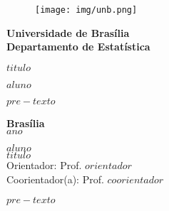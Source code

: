 \documentclass[12pt, a4paper, twoside]{article}
\numberwithin{equation}{subsection} %
\newcommand{\titulo}{$titulo$}
\newcommand{\autor}{$aluno$}
\newcommand{\orientador}{ Prof. $orientador$ }
\newcommand{\coorientador}{ Prof. $coorientador$ }
\begin{document}
\begin{titlepage}
\begin{center}
\begin{figure}[h!]
	\centering
		\texttt{[image: img/unb.png]}
	\label{fig:unb}
\end{figure}
{\bf Universidade de Brasília \\
\bf Departamento de Estatística}
\vspace{5cm}

\setcounter{page}{0}
\null
\textbf{\titulo}
\vspace{2.5cm}


\vspace{0.2cm}
\textbf{\autor}
\end{center}
\vspace{1.5cm}

\begin{flushright}
\begin{minipage}{7.5cm}
\parbox[t]{7.5cm}{$pre-texto$}
\end{minipage}
\end{flushright}

\vspace{5cm}

\begin{center}
{\bf{Brasília} \\ }
\bf{$ano$}
\end{center}
\end{titlepage}



\thispagestyle{empty}

\begin{center}
\textbf{\autor} \\
\vspace{5cm}
\textbf{\titulo} \\
\vspace{3cm}
\small
Orientador: \orientador \\
Coorientador(a): \coorientador
\end{center}


\vspace*{3cm}

\begin{flushright}
\begin{minipage}{7.5cm}
 \parbox[t]{7.5cm}{$pre-texto$}
\end{minipage}
\end{flushright}

\vspace{5cm}
\end{document}
